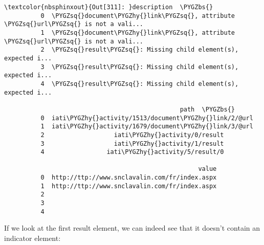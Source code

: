 \documentclass[letterpaper,10pt,english]{sphinxmanual}
\begin{document}
\begin{Verbatim}[commandchars=\\\{\}]
\textcolor{nbsphinxout}{Out[311]: }description  \PYGZbs{}
          0  \PYGZsq{}document\PYGZhy{}link\PYGZsq{}, attribute \PYGZsq{}url\PYGZsq{} is not a vali...
          1  \PYGZsq{}document\PYGZhy{}link\PYGZsq{}, attribute \PYGZsq{}url\PYGZsq{} is not a vali...
          2  \PYGZsq{}result\PYGZsq{}: Missing child element(s), expected i...
          3  \PYGZsq{}result\PYGZsq{}: Missing child element(s), expected i...
          4  \PYGZsq{}result\PYGZsq{}: Missing child element(s), expected i...
          
                                                path  \PYGZbs{}
          0  iati\PYGZhy{}activity/1513/document\PYGZhy{}link/2/@url
          1  iati\PYGZhy{}activity/1679/document\PYGZhy{}link/3/@url
          2                   iati\PYGZhy{}activity/0/result
          3                   iati\PYGZhy{}activity/1/result
          4                 iati\PYGZhy{}activity/5/result/0
          
                                                     value
          0  http://ttp://www.snclavalin.com/fr/index.aspx
          1  http://ttp://www.snclavalin.com/fr/index.aspx
          2
          3
          4
\end{Verbatim}

If we look at the first result element, we can indeed see that it
doesn't contain an indicator element:
\end{document}
